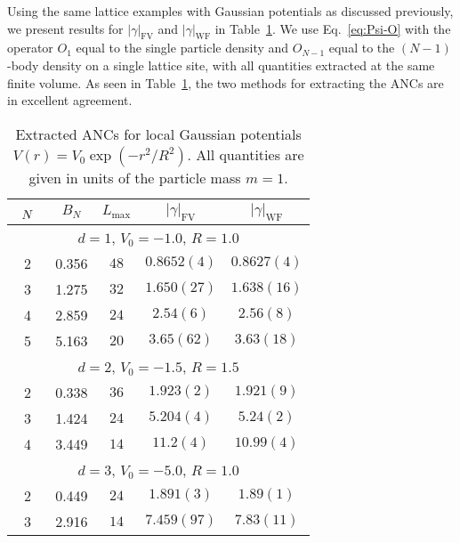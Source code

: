 \documentclass[aps,singlecolumn,superscriptaddress,nofootinbib,tightenlines,
preprintnumbers,showkeys]{revtex4-1}
\newcommand{\abs}[1]{\left|#1\right|}
\begin{document}
Using the same lattice examples with Gaussian potentials as discussed 
previously, we present results for $\abs{\gamma}_{\text{FV}}$ and 
$\abs{\gamma}_{\text{WF}}$ in Table~\ref{tab:Results-Gauss-ANC}.  We use 
Eq.~\eqref{eq:Psi-O} with the operator $O_1$ equal to the single particle 
density and $O_{N-1}$ equal to the $(N{-}1)$-body density on a single lattice 
site, with all quantities extracted at the same finite volume.  As seen in 
Table~\ref{tab:Results-Gauss-ANC}, the two methods for extracting the ANCs are 
in excellent agreement.
%
\begin{table}[htbp]
\centering
\begin{tabular}{ccccc}
\hline\hline
$\rule{0pt}{1.2em}\phantom{x}N\phantom{x}$
& $B_N$
& $L_{\text{max}}$
& $\abs{\gamma}_{\text{FV}}$
& $\abs{\gamma}_{\text{WF}}$ \\
\hline\hline
\multicolumn{5}{c}{\rule{0pt}{1.2em}
$d=1$, $V_0 = {-}1.0$, $R = 1.0$} \\
\hline
\rule{0pt}{1.2em}%
2 & 0.356 & $48$ & $0.8652(4)$ & $0.8627(4)$ \\
3 & 1.275 & $32$ & $1.650(27)$ & $1.638(16)$ \\
4 & 2.859 & $24$ & $2.54(6)$   & $2.56(8) $ \\
5 & 5.163 & $20$ & $3.65(62)$  & $3.63(18)$ \\
\hline\hline
\multicolumn{5}{c}{\rule{0pt}{1.2em}
$d=2$, $V_0 = {-}1.5$, $R = 1.5$} \\
\hline
\rule{0pt}{1.2em}%
2 & 0.338 & $36$ & $1.923(2)$ & $1.921(9)$ \\
3 & 1.424 & $24$ & $5.204(4)$ & $5.24(2)$ \\
4 & 3.449 & $14$ & $11.2(4)$  & $10.99(4)$ \\
\hline\hline
\multicolumn{5}{c}{\rule{0pt}{1.2em}
$d=3$, $V_0 = {-}5.0$, $R=1.0$} \\
\hline
\rule{0pt}{1.2em}%
2 & 0.449 & $24$ & $1.891(3)$ & $1.89(1)$ \\
3 & 2.916 & $14$ & $7.459(97)$ & $7.83(11)$ \\
\hline\hline
\end{tabular}
\caption{Extracted ANCs for local Gaussian potentials $V(r) = 
V_0\exp(-r^2/R^2)$.  All quantities are given in units of the particle mass
$m=1$.}
\label{tab:Results-Gauss-ANC}
\end{table}
\end{document}
